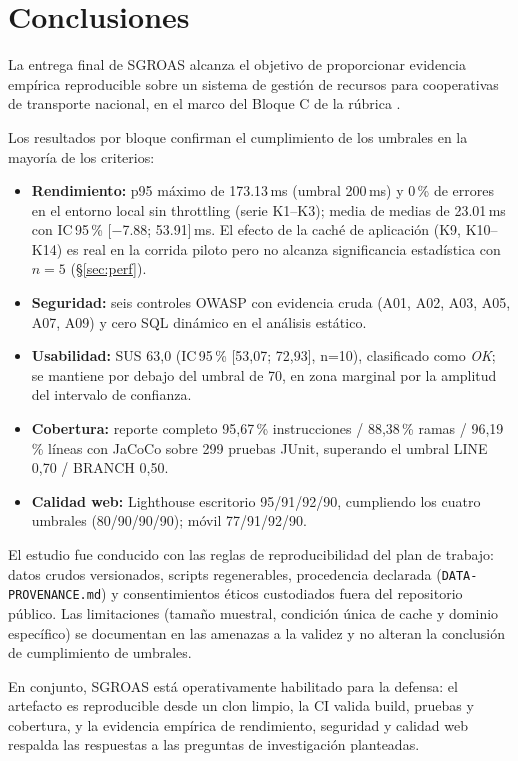 \chapter{Conclusiones}
\label{cap:conclusiones}

La entrega final de SGROAS alcanza el objetivo de proporcionar evidencia empírica
reproducible sobre un sistema de gestión de recursos para cooperativas de
transporte nacional, en el marco del Bloque C de la rúbrica \cite{uteq2026guia}.

Los resultados por bloque confirman el cumplimiento de los umbrales en la mayoría
de los criterios:
\begin{itemize}
  \item \textbf{Rendimiento:} p95 máximo de 173.13\,ms (umbral 200\,ms) y 0\,\% de
        errores en el entorno local sin throttling (serie K1--K3); media de medias
        de 23.01\,ms con IC\,95\,\% [$-$7.88; 53.91]\,ms. El efecto de la caché de
        aplicación (K9, K10--K14) es real en la corrida piloto pero no alcanza
        significancia estadística con $n=5$ (\S\ref{sec:perf}).
  \item \textbf{Seguridad:} seis controles OWASP con evidencia cruda (A01, A02,
        A03, A05, A07, A09) y cero SQL dinámico en el análisis estático.
  \item \textbf{Usabilidad:} SUS 63,0 (IC\,95\,\% [53,07; 72,93], n=10), clasificado como
        \emph{OK}; se mantiene por debajo del umbral de 70, en zona marginal por la
        amplitud del intervalo de confianza.
  \item \textbf{Cobertura:} reporte completo 95,67\,\% instrucciones / 88,38\,\% ramas / 96,19\,\% líneas con JaCoCo sobre 299 pruebas JUnit, superando el umbral LINE 0,70 / BRANCH 0,50.
  \item \textbf{Calidad web:} Lighthouse escritorio 95/91/92/90, cumpliendo los cuatro
        umbrales (80/90/90/90); móvil 77/91/92/90.
\end{itemize}

El estudio fue conducido con las reglas de reproducibilidad del plan de trabajo:
datos crudos versionados, scripts regenerables, procedencia declarada
(\texttt{DATA-PROVENANCE.md}) y consentimientos éticos custodiados fuera del
repositorio público. Las limitaciones (tamaño muestral, condición única de cache y
dominio específico) se documentan en las amenazas a la validez y no alteran la
conclusión de cumplimiento de umbrales.

En conjunto, SGROAS está operativamente habilitado para la defensa: el artefacto
es reproducible desde un clon limpio, la CI valida build, pruebas y cobertura, y la
evidencia empírica de rendimiento, seguridad y calidad web respalda las respuestas
a las preguntas de investigación planteadas.